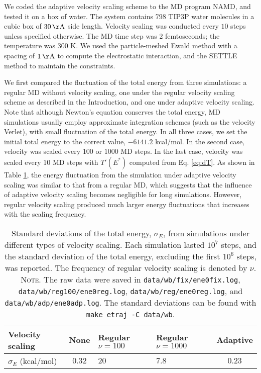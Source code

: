 \documentclass[reprint]{revtex4-1}
\newcommand{\note}[1]{{\color{DarkGreen}\footnotesize \textsc{Note.} #1}}
\begin{document}
We coded the adaptive velocity scaling scheme to
the MD program NAMD\cite{NAMD},
and tested it on a box of water.
%
The system contains
$798$ TIP3P water molecules\cite{jorgensen1983}
in a cubic box of $30 \, \mathrm{\AA}$ side length.
%
Velocity scaling was conducted every $10$ steps
unless specified otherwise.
%
The MD time step was $2$ femtoseconds;
the temperature was $300$ K.
%
We used the particle-meshed Ewald method\cite{essmann1995}
with a spacing of $1 \, \mathrm{\AA}$
to compute the electrostatic interaction,
and the SETTLE method\cite{miyamoto1992}
to maintain the constraints.


We first compared the fluctuation of the total energy
from three simulations:
%
a regular MD without velocity scaling,
one under the regular velocity scaling scheme as described in the Introduction,
and one under adaptive velocity scaling.
%
Note that although Newton's equation conserves the total energy,
MD simulations usually employ approximate integration schemes
(such as the velocity Verlet),
with
small fluctuation of the total energy.
%
In all three cases,
we set the initial total energy to the correct value, $-6141.2$ kcal/mol.
%
In the second case,
velocity was scaled every $100$ or $1000$ MD steps.
%
In the last case,
velocity was scaled every $10$ MD steps with
$T'(E^*)$ computed from Eq. \eqref{eq:dT}.
%
As shown in Table \ref{tab:etraj},
the energy fluctuation from the simulation under adaptive velocity scaling
was similar to that from a regular MD,
which suggests that the influence of adaptive velocity scaling
becomes negligible for long simulations.
%
However, regular velocity scaling
produced much larger energy fluctuations
that increases with the scaling frequency.

\begin{table}[h]
  \setlength{\tabcolsep}{5pt}
  \renewcommand{\arraystretch}{1.5}
  \begin{center}
    \begin{tabular}{ p{2.5cm} | c p{1.3cm} p{1.3cm} c }
      \hline
      Velocity scaling
      &   None    &   Regular \newline $\nu =100 $   & Regular \newline $\nu = 1000$  &   Adaptive \\
      \hline
      $\sigma_E$ (kcal/mol)
      &   $0.32$  &   $20$    &  $7.8$     &   $0.23$ \\
      \hline
    \end{tabular}
  \end{center}
  \caption{
    \label{tab:etraj}
    Standard deviations of the total energy, $\sigma_E$,
    from simulations under different types of velocity scaling.
    Each simulation lasted $10^7$ steps,
    and the standard deviation of the total energy,
    excluding the first $10^6$ steps, was reported.
    The frequency of regular velocity scaling
    is denoted by $\nu$.
    \note{
      The raw data were saved in
      \texttt{data/wb/fix/ene0fix.log},
      \texttt{data/wb/reg100/ene0reg.log},
      \texttt{data/wb/reg/ene0reg.log},
      and
      \texttt{data/wb/adp/ene0adp.log}.
      The standard deviations can be found with
      \texttt{make etraj -C data/wb}.
    }%
  }
\end{table}
\end{document}
